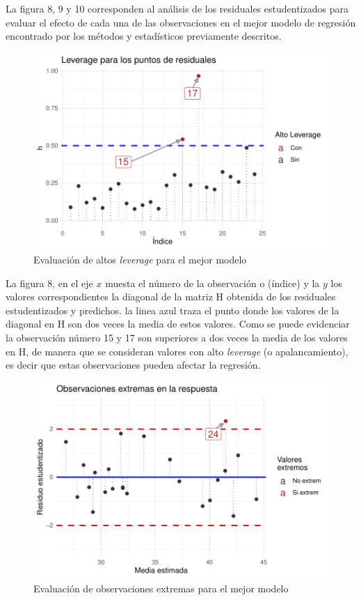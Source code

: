 \documentclass[
]{article}
\begin{document}
La figura 8, 9 y 10 corresponden al análisis de los residuales
estudentizados para evaluar el efecto de cada una de las observaciones
en el mejor modelo de regresión encontrado por los métodos y
estadísticos previamente descritos.

\begin{figure}
\centering
\includegraphics{diagnosticorrpp_files/figure-latex/residuals LEVERAGE para bestmodel-1.pdf}
\caption{Evaluación de altos \emph{leverage} para el mejor modelo}
\end{figure}

La figura 8, en el eje \(x\) muesta el número de la observación o
(índice) y la \(y\) los valores correspondientes la diagonal de la
matriz H obtenida de los residuales estudentizados y predichos. la linea
azul traza el punto donde los valores de la diagonal en H son dos veces
la media de estos valores. Como se puede evidenciar la observación
número 15 y 17 son superiores a dos veces la media de los valores en H,
de manera que se consideran valores con alto \emph{leverage} (o
apalancamiento), es decir que estas observaciones pueden afectar la
regresión.

\begin{figure}
\centering
\includegraphics{diagnosticorrpp_files/figure-latex/observaciones EXTREMAS para bestmodel-1.pdf}
\caption{Evaluación de observaciones extremas para el mejor modelo}
\end{figure}
\end{document}

